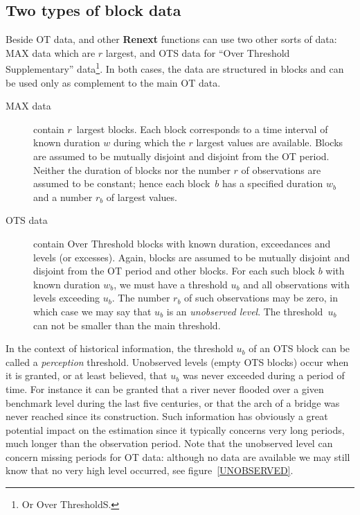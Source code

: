 \documentclass[a4paper]{report}
\newcommand{\pkg}[1]{\textbf{#1}}
\begin{document}
\subsection{Two types of block data}
\label{TwoTypes}
Beside OT data, \verb@Renouv@ and other \pkg{Renext} functions can use
two other sorts of data: MAX data which are $r$ largest, and OTS data
for ``Over Threshold Supplementary'' data\footnote{Or Over
  ThresholdS.}.  In both cases, the data are structured in blocks and
can be used only as complement to the main OT data.

\begin{description}
  
\item[MAX data] contain $r$~largest blocks. Each block corresponds to
  a time interval of known duration $w$ during which the $r$ largest
  values are available. Blocks are assumed to be mutually disjoint and
  disjoint from the OT period. Neither the duration of blocks nor the
  number $r$ of observations are assumed to be constant; hence each
  block~$b$ has a specified duration $w_b$ and a number $r_b$ of
  largest values.


\item [OTS data] contain Over Threshold blocks with known duration, 
  exceedances and levels (or excesses). Again, blocks are assumed to be mutually
  disjoint and disjoint from the OT period and other 
  blocks. For each such block $b$ with known duration $w_b$, we must
  have a threshold $u_b$ and all observations with levels exceeding
  $u_b$. The number $r_b$ of such observations may be zero, in which
  case we may say that $u_b$ is an \textit{unobserved level}. The
  threshold~$u_b$ can not be smaller than the main threshold.


\end{description}

In the context of historical information, the threshold $u_b$ of an
OTS block can be called a \textit{perception} threshold.  Unobserved
levels (empty OTS blocks) occur when it is granted, or at least
believed, that $u_b$ was never exceeded during a period of time. For
instance it can be granted that a river never flooded over a given
benchmark level during the last five centuries, or that the arch of a
bridge was never reached since its construction. Such information has
obviously a great potential impact on the estimation since it
typically concerns very long periods, much longer than the observation
period. Note that the unobserved level can concern missing periods for
OT data: although no data are available we may still know that no very
high level occurred, see figure~\ref{UNOBSERVED}.
  
\end{document}
